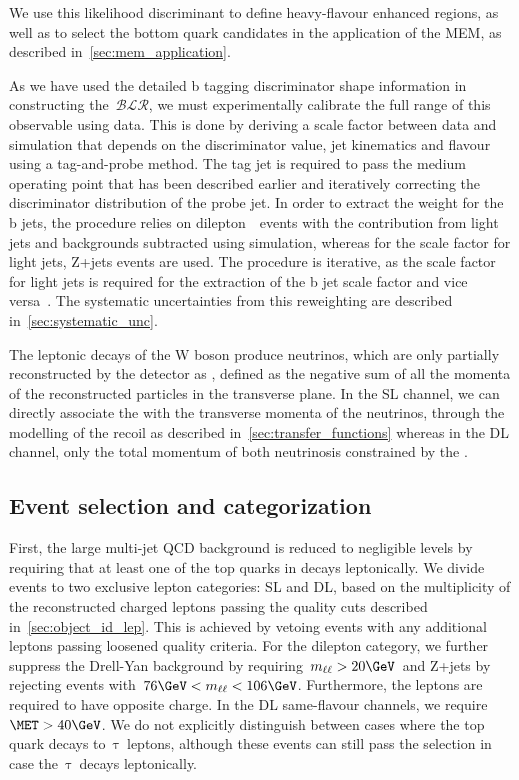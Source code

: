 We use this likelihood discriminant to define heavy-flavour enhanced regions, as well as to select the bottom quark candidates in the application of the MEM, as described in~\cref{sec:mem_application}. 

As we have used the detailed b tagging discriminator shape information in constructing the~$\mathcal{BLR}$, we must experimentally calibrate the full range of this observable using data. This is done by deriving a scale factor between data and simulation that depends on the discriminator value, jet kinematics and flavour using a tag-and-probe method. The tag jet is required to pass the medium operating point that has been described earlier and iteratively correcting the discriminator distribution of the probe jet. In order to extract the weight for the b jets, the procedure relies on dilepton~\ttbar~events with the contribution from light jets and backgrounds subtracted using simulation, whereas for the scale factor for light jets, Z+jets events are used. The procedure is iterative, as the scale factor for light jets is required for the extraction of the b jet scale factor and vice versa~\cite{CMS:2013sea,CMS-PAS-BTV-15-001}. The systematic uncertainties from this reweighting are described in~\cref{sec:systematic_unc}.

The leptonic decays of the W boson produce neutrinos, which are only partially reconstructed by the detector as \MET, defined as the negative sum of all the momenta of the reconstructed particles in the transverse plane. In the SL channel, we can directly associate the \MET with the transverse momenta of the neutrinos, through the modelling of the recoil as described in~\cref{sec:transfer_functions} whereas in the DL channel, only the total momentum of both neutrinosis  constrained by the \MET.

\subsection{Event selection and categorization}
\label{sec:event_selection}

First, the large multi-jet QCD background is reduced to negligible levels by requiring that at least one of the top quarks in \ttHbb decays leptonically. We divide events to two exclusive lepton categories: SL and DL, based on the multiplicity of the reconstructed charged leptons passing the quality cuts described in~\cref{sec:object_id_lep}. This is achieved by vetoing events with any additional leptons passing loosened quality criteria. For the dilepton category, we further suppress the Drell-Yan background by requiring~$m_{\ell\ell} > 20\GeV$~and Z+jets by rejecting events with~$76\GeV < m_{\ell\ell} < 106\GeV$. Furthermore, the leptons are required to have opposite charge. In the DL same-flavour channels, we require~$\MET > 40\GeV$. We do not explicitly distinguish between cases where the top quark decays to~$\mathrm{\tau}$~leptons, although these events can still pass the selection in case the~$\mathrm{\tau}$~decays leptonically.

